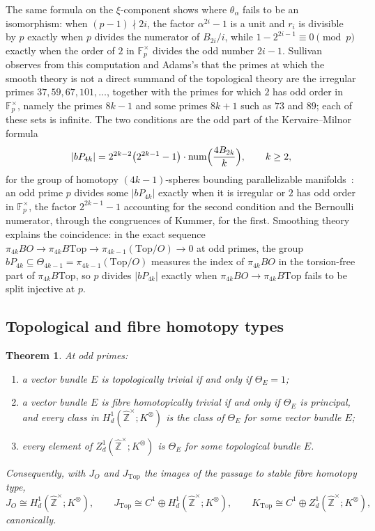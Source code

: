 \documentclass[11pt]{amsart}
\theoremstyle{plain}
\newtheorem{theorem}{Theorem}[section]
\theoremstyle{definition}
\numberwithin{equation}{section}
\newcommand{\F}{\mathbb{F}}
\newcommand{\Zhat}{\widehat{\mathbb{Z}}}
\newcommand{\Ktop}{K_{\mathrm{Top}}}
\newcommand{\units}{^{\times}}
\begin{document}
The same formula on the $\xi$-component shows where $\theta_\alpha$ fails to be an isomorphism: when $(p-1)\nmid2i$, the factor $\alpha^{2i}-1$ is a unit and $r_i$ is divisible by $p$ exactly when $p$ divides the numerator of $B_{2i}/i$, while $1-2^{2i-1}\equiv0\pmod p$ exactly when the order of $2$ in $\F_p\units$ divides the odd number $2i-1$.
Sullivan observes from this computation and Adams's that the primes at which the smooth theory is not a direct summand of the topological theory are the irregular primes $37,59,67,101,\dots$, together with the primes for which $2$ has odd order in $\F_p\units$, namely the primes $8k-1$ and some primes $8k+1$ such as $73$ and $89$; each of these sets is infinite.
The two conditions are the odd part of the Kervaire--Milnor formula
\[
|bP_{4k}|=2^{2k-2}\bigl(2^{2k-1}-1\bigr)\cdot\operatorname{num}\Bigl(\frac{4B_{2k}}{k}\Bigr),\qquad k\ge2,
\]
for the group of homotopy $(4k-1)$-spheres bounding parallelizable manifolds~\cite{KervaireMilnor}: an odd prime $p$ divides some $|bP_{4k}|$ exactly when it is irregular or $2$ has odd order in $\F_p\units$, the factor $2^{2k-1}-1$ accounting for the second condition and the Bernoulli numerator, through the congruences of Kummer, for the first.
Smoothing theory explains the coincidence: in the exact sequence $\pi_{4k}BO\to\pi_{4k}B\mathrm{Top}\to\pi_{4k-1}(\mathrm{Top}/O)\to0$ at odd primes, the group $bP_{4k}\subseteq\Theta_{4k-1}=\pi_{4k-1}(\mathrm{Top}/O)$ measures the index of $\pi_{4k}BO$ in the torsion-free part of $\pi_{4k}B\mathrm{Top}$, so $p$ divides $|bP_{4k}|$ exactly when $\pi_{4k}BO\to\pi_{4k}B\mathrm{Top}$ fails to be split injective at $p$.

\subsection{Topological and fibre homotopy types}

\begin{theorem}\label{thm:Theta}
At odd primes:
\begin{enumerate}[label=\textup{(\arabic*)}]
\item a vector bundle $E$ is topologically trivial if and only if $\Theta_E=1$;
\item a vector bundle $E$ is fibre homotopically trivial if and only if $\Theta_E$ is principal, and every class in $H^1_d(\Zhat\units;K^\otimes)$ is the class of $\Theta_E$ for some vector bundle $E$;
\item every element of $Z^1_d(\Zhat\units;K^\otimes)$ is $\Theta_E$ for some topological bundle $E$.
\end{enumerate}
Consequently, with $J_O$ and $J_{\mathrm{Top}}$ the images of the passage to stable fibre homotopy type,
\[
J_O\cong H^1_d(\Zhat\units;K^\otimes),\qquad J_{\mathrm{Top}}\cong C^1\oplus H^1_d(\Zhat\units;K^\otimes),\qquad\Ktop\cong C^1\oplus Z^1_d(\Zhat\units;K^\otimes),
\]
canonically.
\end{theorem}
\end{document}

